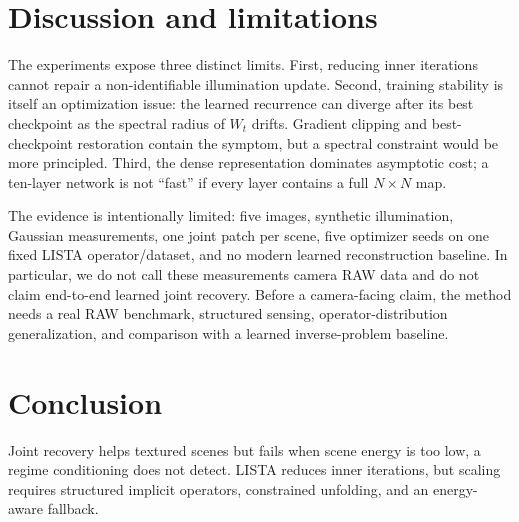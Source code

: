 \documentclass[anon]{opt2026}
\begin{document}
\section{Discussion and limitations}

The experiments expose three distinct limits.  First, reducing inner
iterations cannot repair a non-identifiable illumination update.  Second,
training stability is itself an optimization issue: the learned recurrence
can diverge after its best checkpoint as the spectral radius of $W_t$ drifts.
Gradient clipping and best-checkpoint restoration contain the symptom, but a
spectral constraint would be more principled.  Third, the dense representation
dominates asymptotic cost; a ten-layer network is not ``fast'' if every layer
contains a full $N\times N$ map.

The evidence is intentionally limited: five images, synthetic illumination,
Gaussian measurements, one joint patch per scene, five optimizer seeds on one
fixed LISTA operator/dataset, and no modern learned reconstruction baseline.
In particular, we do not call these measurements camera RAW data and do not
claim end-to-end learned joint recovery.  Before a camera-facing claim, the
method needs a real RAW benchmark, structured sensing, operator-distribution
generalization, and comparison with a learned inverse-problem baseline.

\section{Conclusion}

Joint recovery helps textured scenes but fails when scene energy is too low,
a regime conditioning does not detect.  LISTA reduces inner iterations, but
scaling requires structured implicit operators, constrained unfolding, and an
energy-aware fallback.

\clearpage

\end{document}
